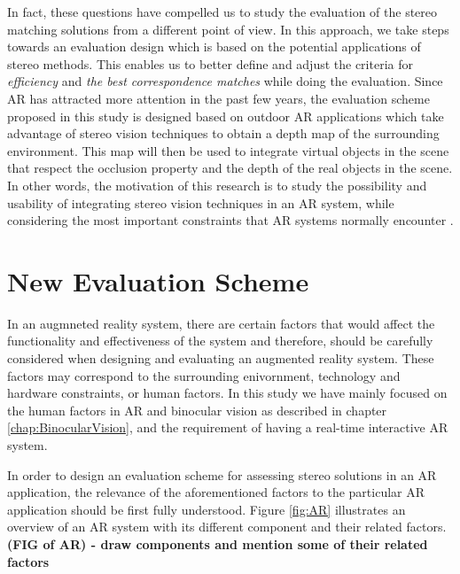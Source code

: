 In fact, these questions have compelled us to study the evaluation of the stereo matching solutions from a different point of view.
In this approach, we take steps towards an evaluation design which is based on the potential applications of stereo methods.
This enables us to better define and adjust the criteria for \textit{efficiency} and 
\textit{the best correspondence matches} while doing the evaluation.
Since AR has attracted more attention in the past few years, 
the evaluation scheme proposed in this study is designed based on outdoor AR applications which take advantage of
stereo vision techniques to obtain a depth map of the surrounding environment. This map will then be used to
integrate virtual objects in the scene that respect the occlusion property and the depth of the real objects in the scene. 
In other words, the motivation of this research is to study the possibility and usability of integrating stereo vision techniques in an AR system, while considering the most
important constraints that AR systems normally encounter \cite{liv05}.

\section{New Evaluation Scheme}

In an augmneted reality system, there are certain factors that would affect the functionality and effectiveness of the system \cite{liv05,kru10} and therefore, 
should be carefully considered when designing and evaluating an augmented reality system. 
These factors may correspond to the surrounding 
enivornment, technology and hardware constraints, or human factors. 
In this study we have mainly focused on the human factors in AR and binocular vision as described in chapter \ref{chap:BinocularVision},
and the requirement of having a real-time interactive AR system.

In order to design an evaluation scheme for assessing stereo solutions in an AR application, the relevance of the aforementioned factors to the particular AR application
should be first fully understood. Figure \ref{fig:AR} illustrates an overview of an AR system with its different component and their related factors.
\textbf{(FIG of AR) - draw components and mention some of their related factors}



